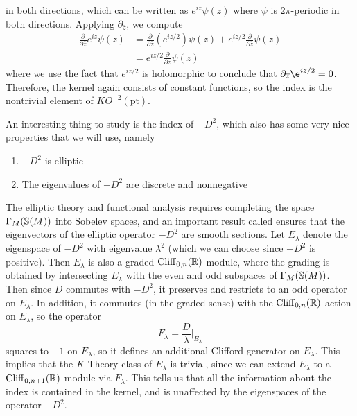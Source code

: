 \begin{exmp}
\begin{enumerate}
  in both directions, which can be written as $e^{iz}\psi(z)$ where $\psi$ is
  $2\pi$-periodic in both directions. Applying $\partial_{\overline{z}}$, we compute
  \begin{align*}
  \frac{\partial}{\partial\overline{z}}e^{iz}\psi(z)
  &= \frac{\partial}{\partial\overline{z}}(e^{iz/2})\psi(z)
  + e^{iz/2}\frac{\partial}{\partial\overline{z}}\psi(z) \\[5pt]
  &= e^{iz/2}\frac{\partial}{\partial\overline{z}}\psi(z)
  \end{align*}
  where we use the fact that $e^{iz/2}$ is holomorphic to conclude that
  $\partial_{\overline{z}}\e^{iz/2} = 0$. Therefore, the kernel again consists
  of constant functions, so the index is the nontrivial element of
  $KO^{-2}(\mathrm{pt})$.
\end{enumerate}
\end{exmp}

An interesting thing to study is the index of $-D^2$, which also has some very nice
properties that we will use, namely
\begin{enumerate}
  \item $-D^2$ is elliptic
  \item The eigenvalues of $-D^2$ are discrete and nonnegative
\end{enumerate}
%
The elliptic theory and functional analysis requires completing the space
$\Gamma_M(\S(M))$ into Sobelev spaces, and an important result called  ensures that the eigenvectors of the elliptic operator $-D^2$ are smooth
sections. Let $E_\lambda$ denote the eigenspace of $-D^2$ with eigenvalue $\lambda^2$
(which we can choose since $-D^2$ is positive). Then $E_\lambda$ is also a graded
$\Cliff_{0,n}(\R)$ module, where the grading is obtained by intersecting $E_\lambda$
with the even and odd subspaces of $\Gamma_M(\S(M))$. Then since $D$ commutes with
$-D^2$, it preserves and restricts to an odd operator on $E_\lambda$. In addition,
it commutes (in the graded sense) with the $\Cliff_{0,n}(\R)$ action on $E_\lambda$,
so the operator
\[
F_\lambda = \frac{D}{\lambda}\bigg\vert_{E_\lambda}
\]
squares to $-1$ on $E_\lambda$, so it defines an additional Clifford generator on
$E_\lambda$. This implies that the $K$-Theory class of $E_\lambda$ is trivial, since
we can extend $E_\lambda$ to a $\Cliff_{0, n+1}(\R)$ module via $F_\lambda$. This
tells us that all the information about the index is contained in the kernel, and is
unaffected by the eigenspaces of the operator $-D^2$.
%